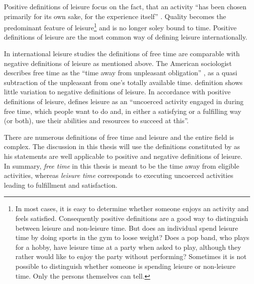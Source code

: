 \documentclass[12pt,numbers=noenddot,parskip,bibliography=totocnumbered,listof=totocnumbered,draft]{scrreprt}
\begin{document}
Positive definitions of leisure focus on the fact, that an activity ``has been chosen primarily for its own sake, for the experience itself'' \citep[p.15]{freysinger2000}. Quality becomes the predominant feature of leisure\footnote{In most cases, it is easy to determine whether someone enjoys an activity and feels satisfied. Consequently positive definitions are a good way to distinguish between leisure and non-leisure time. But does an individual spend leisure time by doing sports in the gym to loose weight? Does a pop band, who plays for a hobby, have leisure time at a party when asked to play, although they rather would like to enjoy the party without performing? Sometimes it is not possible to distinguish whether someone is spending leisure or non-leisure time. Only the persons themselves can tell.} and is no longer soley bound to time. Positive definitions of leisure are the most common way of defining leisure internationally.

In international leisure studies the definitions of free time are comparable with negative definitions of leisure as mentioned above. The American sociologist \citeauthor{stebbins2007} describes free time as the ``time away from unpleasant obligation'' \citep[p.4]{stebbins2007}, as a quasi subtraction of the unpleasant from one's totally available time. \citeauthor{stebbins2007} definition shows little variation to negative definitions of leisure. In accordance with positive definitions of leisure, \citeauthor{stebbins2007} defines leisure as an ``uncoerced  activity engaged in during free time, which people want to do and, in either a satisfying or a fulfilling way (or both), use their abilities and resources to succeed at this''.

There are numerous definitions of free time and leisure and the entire field is complex. The discussion in this thesis will use the definitions constituted by \citeauthor{stebbins2007} as his statements are well applicable to positive and negative definitions of leisure. In summary, \textit{free time} in this thesis is meant to be the time away from eligible activities, whereas \textit{leisure time} corresponds to executing uncoerced activities leading to fulfillment and satisfaction.
\end{document}
